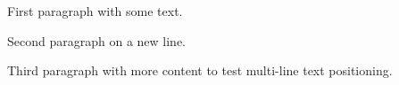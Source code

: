 \documentclass{article}
\begin{document}
\noindent
First paragraph with some text.

Second paragraph on a new line.

Third paragraph with more content to test multi-line text positioning.
\end{document}
